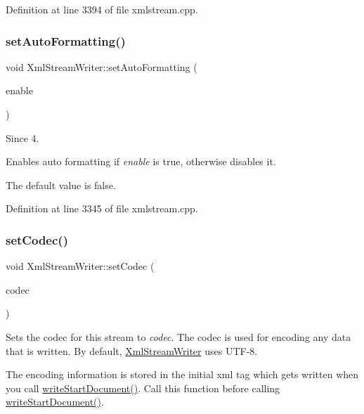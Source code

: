 Definition at line 3394 of file xmlstream.\+cpp.

\mbox{\label{class_xml_stream_writer_a537defbbbbbad819448033b22aaf0d28}} 
\subsubsection{\texorpdfstring{set\+Auto\+Formatting()}{setAutoFormatting()}}
{\footnotesize\ttfamily void Xml\+Stream\+Writer\+::set\+Auto\+Formatting (\begin{DoxyParamCaption}\item[{bool}]{enable }\end{DoxyParamCaption})}

\begin{DoxySince}{Since}
4.
\end{DoxySince}
Enables auto formatting if {\itshape enable} is {\ttfamily true}, otherwise disables it.

The default value is {\ttfamily false}. 

Definition at line 3345 of file xmlstream.\+cpp.

\mbox{\label{class_xml_stream_writer_ab73a5ee5db6824afd4a2bc66e8f12e78}} 
\subsubsection{\texorpdfstring{set\+Codec()}{setCodec()}\hspace{0.1cm}{\footnotesize\ttfamily [1/2]}}
{\footnotesize\ttfamily void Xml\+Stream\+Writer\+::set\+Codec (\begin{DoxyParamCaption}\item[{Q\+Text\+Codec $\ast$}]{codec }\end{DoxyParamCaption})}

Sets the codec for this stream to {\itshape codec}. The codec is used for encoding any data that is written. By default, \hyperlink{class_xml_stream_writer}{Xml\+Stream\+Writer} uses U\+T\+F-\/8.

The encoding information is stored in the initial xml tag which gets written when you call \hyperlink{class_xml_stream_writer_ae9d5ccf2e94485352e4c1c8843dc0641}{write\+Start\+Document()}. Call this function before calling \hyperlink{class_xml_stream_writer_ae9d5ccf2e94485352e4c1c8843dc0641}{write\+Start\+Document()}.

